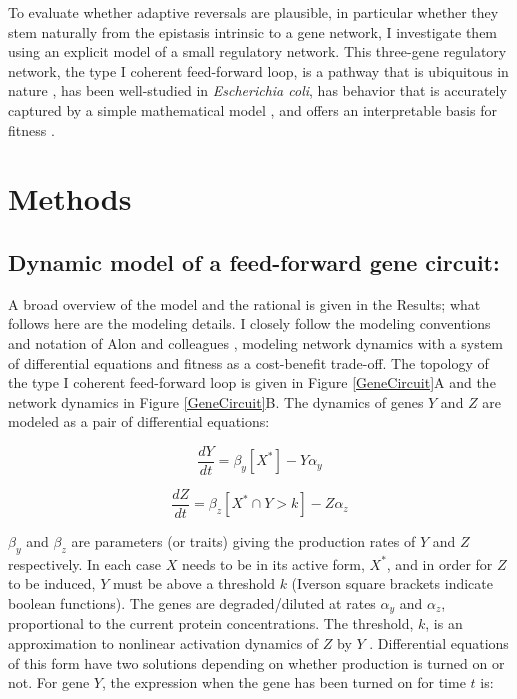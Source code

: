 \documentclass[dvips,12pt,twoside,titlepage]{article}
\begin{document}
To evaluate whether adaptive reversals are plausible, in particular whether they stem naturally from the epistasis intrinsic to a gene network, I investigate them using an explicit model of a small regulatory network. This three-gene regulatory network, the type I coherent feed-forward loop, is a pathway that is ubiquitous in nature \cite{ShenOrr:2002jo,Mangan:2003vl}, has been well-studied in \emph{Escherichia coli}, has behavior that is accurately captured by a simple mathematical model \cite{Mangan:2003vl}, and offers an interpretable basis for fitness \cite{Dekel:2005bd}. 

\section*{Methods}

\subsection*{Dynamic model of a feed-forward gene circuit:}

A broad overview of the model and the rational is given in the Results; what follows here are the modeling details.
I closely follow the modeling conventions and notation of Alon and colleagues \cite{ShenOrr:2002jo,Alon:2006tm}, modeling network dynamics with a system of differential equations and fitness as a cost-benefit trade-off. The topology of the type I coherent feed-forward loop is given in Figure \ref{GeneCircuit}A and the network dynamics in Figure \ref{GeneCircuit}B.
The dynamics of genes $Y$ and $Z$ are modeled as a pair of differential equations:

\begin{equation*}
\frac{dY}{dt} = \beta_{y}[X^{*}] - Y \alpha_{y}
\end{equation*}

\begin{equation*}
\frac{dZ}{dt} = \beta_{z}[X^{*} \cap Y > k] - Z \alpha_{z}
\end{equation*}

\vspace{0.6cm}

\noindent $\beta_y$ and $\beta_z$ are parameters (or traits) giving the production rates of $Y$ and $Z$ respectively. In each case $X$ needs to be in its active form, $X^{*}$, and in order for $Z$ to be induced, $Y$ must be above a threshold $k$ (Iverson square brackets indicate boolean functions). The genes are degraded/diluted at rates $\alpha_y$ and $\alpha_z$, proportional to the current protein concentrations. The threshold, $k$, is an approximation to nonlinear activation dynamics of $Z$ by $Y$ \cite{Alon:2006tm}. Differential equations of this form have two solutions depending on whether production is turned on or not. For gene $Y$, the expression when the gene has been turned on for time $t$ is:
\end{document}

